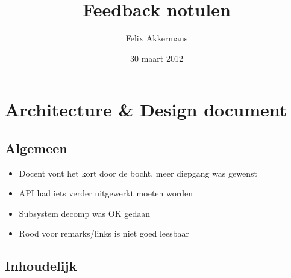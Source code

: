 \documentclass{article}
\begin{document}
\title{Feedback notulen}
\author{Felix Akkermans}
\date{30 maart 2012}

\maketitle

\section{Architecture \& Design document}
\subsection{Algemeen}

\begin{itemize}
\item Docent vont het kort door de bocht, meer diepgang was gewenst
\item API had iets verder uitgewerkt moeten worden
\item Subsystem decomp was OK gedaan
\item Rood voor remarks/links is niet goed leesbaar
\end{itemize}

\subsection{Inhoudelijk}
\end{document}
